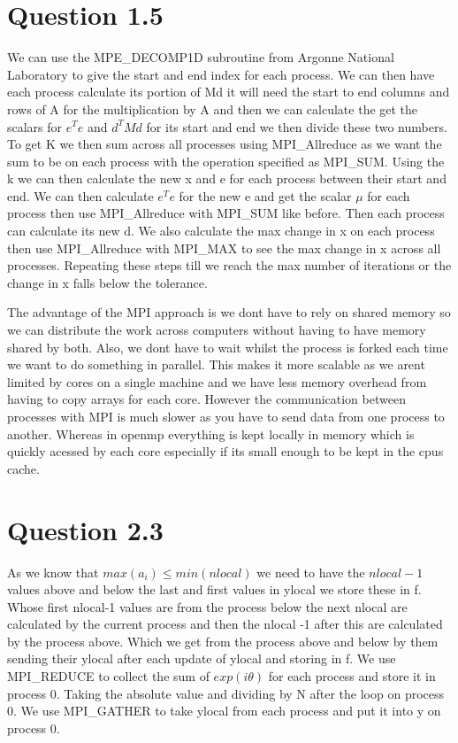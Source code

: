 \documentclass{article}
\begin{document}
\newpage

\section*{Question 1.5}
We can use the MPE\_DECOMP1D subroutine from Argonne National Laboratory to 
give the start and end index for each process. We can then have each process
calculate its portion of Md it will need the start to end columns and rows of A for the multiplication by A and then we can calculate the get the scalars for
$e^{T}e$ and $d^{T}Md$ for its start and end we then divide these two numbers.
To get K we then sum across all processes using MPI\_Allreduce as we want the sum
to be on each process with the operation specified as MPI\_SUM. Using the k
we can then calculate the new x and e for each process between their start and end.
We can then calculate $e^{T}e$ for the new e and get the scalar $\mu$ for each 
process then use MPI\_Allreduce with MPI\_SUM like before. Then each process can 
calculate its new d. We also calculate the max change in x on each process
then use MPI\_Allreduce with MPI\_MAX to see the max change in x across all processes.
Repeating these steps till we reach the max number of iterations
or the change in x falls below the tolerance.

The advantage of the MPI approach is we dont have to rely on shared memory
so we can distribute the work across computers without having to have memory
shared by both. Also, we dont have to wait whilst the process is forked each time 
we want to do something in parallel. This makes it more scalable as we arent limited by cores on
a single machine and we have less memory overhead from having to copy arrays for each core.
However the communication between processes with MPI is much slower as you have to send data 
from one process to another. Whereas in openmp everything is kept locally in memory which 
is quickly acessed by each core especially if its small enough to be kept in the cpus
cache.



\section*{Question 2.3}
As we know that $max(a_{i}) \le min(nlocal)$ we need to have the $nlocal-1$ 
values above and below the last and first values in ylocal we store these in f. Whose first nlocal-1 values
are from the process below the next nlocal are calculated by the current process and then the 
nlocal -1 after this are calculated by the process above. Which we get 
from the process above and below by them sending their ylocal after each update of ylocal and storing in f. We use MPI\_REDUCE
to collect the sum of $exp(i\theta)$ for each process and store it in process 0. Taking the 
absolute value and dividing by N after the loop on process 0. We use MPI\_GATHER to take ylocal from
each process and put it into y on process 0.
\end{document}
